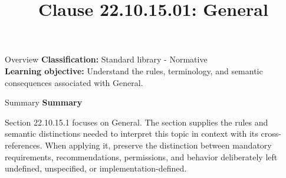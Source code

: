 \documentclass[10pt,letterpaper]{article}
\title{Clause 22.10.15.01: General}
\author{}
\date{}
\begin{document}
\maketitle
\begin{CornellOverviewBox}{Overview}
\textbf{Classification:} Standard library - Normative\\[2pt]
\textbf{Learning objective:} Understand the rules, terminology, and semantic consequences associated with General.
\end{CornellOverviewBox}\begin{CornellSummaryBox}{Summary}
{\sffamily\bfseries\color{Accent} Summary}\par\vspace{3pt}Section 22.10.15.1 focuses on General. The section supplies the rules and semantic distinctions needed to interpret this topic in context with its cross-references. When applying it, preserve the distinction between mandatory requirements, recommendations, permissions, and behavior deliberately left undefined, unspecified, or implementation-defined.
\end{CornellSummaryBox}
\end{document}
